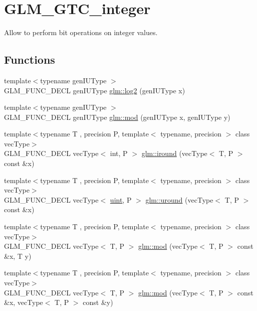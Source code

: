 \hypertarget{group__gtc__integer}{}\section{G\+L\+M\+\_\+\+G\+T\+C\+\_\+integer}
\label{group__gtc__integer}


Allow to perform bit operations on integer values.  


\subsection*{Functions}
\begin{DoxyCompactItemize}
\item 
{\footnotesize template$<$typename gen\+I\+U\+Type $>$ }\\G\+L\+M\+\_\+\+F\+U\+N\+C\+\_\+\+D\+E\+CL gen\+I\+U\+Type \hyperlink{group__gtc__integer_ga9bd682e74bfacb005c735305207ec417}{glm\+::log2} (gen\+I\+U\+Type x)
\item 
{\footnotesize template$<$typename gen\+I\+U\+Type $>$ }\\G\+L\+M\+\_\+\+F\+U\+N\+C\+\_\+\+D\+E\+CL gen\+I\+U\+Type \hyperlink{group__gtc__integer_ga75c6fd2a143fc44e5f7b871abad539e0}{glm\+::mod} (gen\+I\+U\+Type x, gen\+I\+U\+Type y)
\item 
{\footnotesize template$<$typename T , precision P, template$<$ typename, precision $>$ class vec\+Type$>$ }\\G\+L\+M\+\_\+\+F\+U\+N\+C\+\_\+\+D\+E\+CL vec\+Type$<$ int, P $>$ \hyperlink{group__gtc__integer_ga0a42ffb863cc980e91f98d2f5766de20}{glm\+::iround} (vec\+Type$<$ T, P $>$ const \&x)
\item 
{\footnotesize template$<$typename T , precision P, template$<$ typename, precision $>$ class vec\+Type$>$ }\\G\+L\+M\+\_\+\+F\+U\+N\+C\+\_\+\+D\+E\+CL vec\+Type$<$ \hyperlink{group__core__precision_ga4fd29415871152bfb5abd588334147c8}{uint}, P $>$ \hyperlink{group__gtc__integer_gab61b8546aafdf58f119eb892b212607c}{glm\+::uround} (vec\+Type$<$ T, P $>$ const \&x)
\item 
{\footnotesize template$<$typename T , precision P, template$<$ typename, precision $>$ class vec\+Type$>$ }\\G\+L\+M\+\_\+\+F\+U\+N\+C\+\_\+\+D\+E\+CL vec\+Type$<$ T, P $>$ \hyperlink{group__gtc__integer_ga1d3f62c015315540cebf1f915b67dd9c}{glm\+::mod} (vec\+Type$<$ T, P $>$ const \&x, T y)
\item 
{\footnotesize template$<$typename T , precision P, template$<$ typename, precision $>$ class vec\+Type$>$ }\\G\+L\+M\+\_\+\+F\+U\+N\+C\+\_\+\+D\+E\+CL vec\+Type$<$ T, P $>$ \hyperlink{group__gtc__integer_ga689e2d9100af0bfc4d9954c96221095e}{glm\+::mod} (vec\+Type$<$ T, P $>$ const \&x, vec\+Type$<$ T, P $>$ const \&y)
\end{DoxyCompactItemize}


